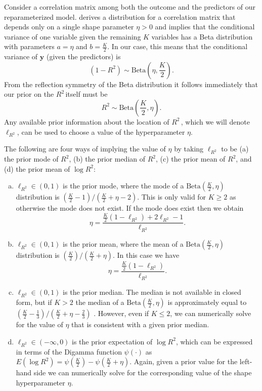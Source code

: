 \documentclass[11pt]{article}
\newcommand{\Rsq}{$R^2\,$}
\newcommand{\y}{\mathbf{y}}
\newcommand{\locRsq}{\ell_{R^2}}
\newcommand{\halfK}{\frac{K}{2}}
\newcommand{\Betadist}[2]{\mathrm{Beta}\left(#1,#2\right)}
\newcommand{\Digamma}[1]{\psi\left(#1\right)}
\begin{document}
Consider a correlation matrix among both the outcome and the predictors of our
reparameterized model.  derives a distribution for a correlation
matrix that depends only on a single shape parameter $\eta > 0$ and implies that
the conditional variance of one variable given the remaining $K$ variables has a
Beta distribution with parameters $a = \eta$ and $b = \halfK$. In our case, this
means that the conditional variance of $\y$ (given the predictors) is
$$(1 - R^2) \sim \Betadist{\eta}{\halfK}.$$
From the reflection symmetry of the Beta distribution it follows immediately
that our prior on the \Rsq itself must be
$$R^2 \sim \Betadist{\halfK}{\eta}.$$
Any available prior information about the location of \Rsq, which we will denote
$\locRsq$, can be used to choose a value of the hyperparameter $\eta$.

The following are four ways of implying the value of $\eta$ by taking
$\locRsq$ to be (a) the prior mode of $R^2$, (b) the prior median of $R^2$,
(c) the prior mean of $R^2$, and (d) the prior mean of $\log{R^2}$:

\begin{enumerate}[(a)]
\item $\locRsq \in \left(0,1\right)$ is the prior mode, where the mode of a
$\Betadist{\halfK}{\eta}$ distribution is \newline
$\left(\halfK - 1\right) / \left(\halfK + \eta - 2\right)$.
This is only valid for $K \geq 2$ as otherwise the mode does not exist. If
the mode does exist then we obtain
$$\eta = \frac{\halfK \left(1 - \locRsq\right) + 2\locRsq - 1}{\locRsq}.$$

\item $\locRsq \in \left(0,1\right)$ is the prior mean, where the mean of a
$\Betadist{\halfK}{\eta}$ distribution is \newline
$\left(\halfK\right) / \left(\halfK + \eta\right)$. In this case we have
$$\eta = \frac{\halfK \left(1 - \locRsq \right)}{\locRsq}.$$


\item $\locRsq \in \left(0,1\right)$ is the prior median. The median is not
available in closed form, but if $K > 2$ the median of a
$\Betadist{\halfK}{\eta}$ is approximately equal to
$\left(\halfK - \frac{1}{3}\right) / \left(\halfK + \eta - \frac{2}{3}\right)$
\cite{kerman}. However, even if $K \leq 2$, we can numerically solve for the
value of $\eta$ that is consistent with a given prior median.

\item $\locRsq \in \left(-\infty,0\right)$ is the prior expectation of
$\log{R^2}$, which can be expressed in terms of the Digamma function
$\Digamma{\cdot}$ as
$E\left(\log{R^2}\right) = \Digamma{\halfK} - \Digamma{\halfK + \eta}$. Again,
given a prior value for the left-hand side we can numerically solve for the
corresponding value of the shape hyperparameter $\eta$.
\end{enumerate}
\end{document}
